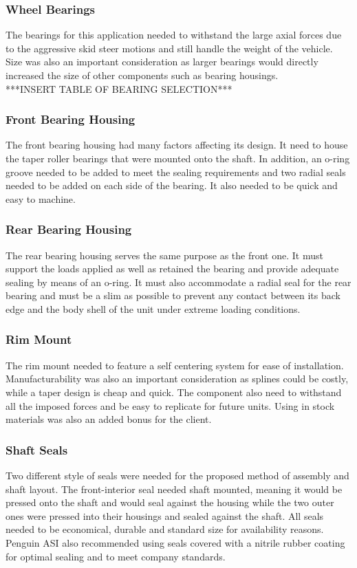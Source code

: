 \subsubsection{Wheel Bearings}
The bearings for this application needed to withstand the large axial forces due to the aggressive skid steer motions and still handle the weight of the vehicle. Size was also an important consideration as larger bearings would directly increased the size of other components such as bearing housings.
\\
***INSERT TABLE OF BEARING SELECTION***
\\

\subsubsection{Front Bearing Housing}
The front bearing housing had many factors affecting its design. It need to house the taper roller bearings that were mounted onto the shaft. In addition, an o-ring groove needed to be added to meet the sealing requirements and two radial seals needed to be added on each side of the bearing. It also needed to be quick and easy to machine. 

\subsubsection{Rear Bearing Housing}
The rear bearing housing serves the same purpose as the front one. It must support the loads applied as well as retained the bearing and provide adequate sealing by means of an o-ring. It must also accommodate a radial seal for the rear bearing and must be a slim as possible to prevent any contact between its back edge and the body shell of the unit under extreme loading conditions.


\subsubsection{Rim Mount}
The rim mount needed to feature a self centering system for ease of installation. Manufacturability was also an important consideration as splines could be costly, while a taper design is cheap and quick. The component also need to withstand all the imposed forces and be easy to replicate for future units. Using in stock materials was also an added bonus for the client.

\subsubsection{Shaft Seals}
Two different style of seals were needed for the proposed method of assembly and shaft layout. The front-interior seal needed shaft mounted, meaning it would be pressed onto the shaft and would seal against the housing while the two outer ones were pressed into their housings and sealed against the shaft. All seals needed to be economical, durable and standard size for availability reasons. Penguin ASI also recommended using seals covered with a nitrile rubber coating for optimal sealing and to meet company standards.

